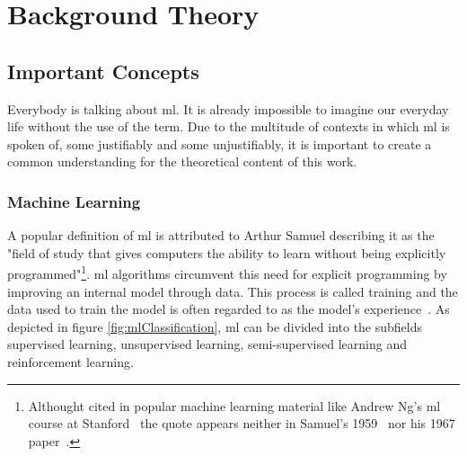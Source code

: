 \documentclass[
			   fontsize=11pt,
               paper=a4,
               bibliography=totoc,
               idxtotoc,
               headsepline,
               footsepline,
               footinclude=false,
               BCOR=12mm,
               DIV=13,
               openany,   %
               ]
               {scrbook}
\begin{document}
\chapter{Background Theory}

\section{Important Concepts}

Everybody is talking about \acrfull{ml}. It is already impossible to imagine our everyday life without the use of the term. Due to the multitude of contexts in which \acrfull{ml} is spoken of, some justifiably and some unjustifiably, it is important to create a common understanding for the theoretical content of this work.


\subsection{Machine Learning}

A popular definition of \gls{ml} is attributed to Arthur Samuel describing it as the "field of study that gives computers the ability to learn without being explicitly programmed"\footnote{Althought cited in popular machine learning material like Andrew Ng's \gls{ml} course at Stanford~\cite{mlCourseStan} the quote appears neither in Samuel's 1959~\cite{mlQuote1959} nor his 1967 paper~\cite{mlQuote1967}.}. \acrlong{ml} algorithms circumvent this need for explicit programming by improving an internal model through data. This process is called training and the data used to train the model is often regarded to as the model's experience~\cite{mlMitchell}. As depicted in figure \ref{fig:mlClassification}, \gls{ml} can be divided into the subfields supervised learning, unsupervised learning, semi-supervised learning and reinforcement learning.
\end{document}
